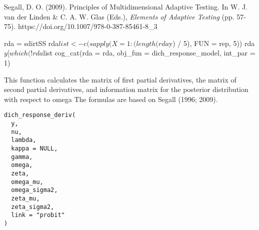 \documentclass[a4paper]{book}
\begin{document}
%
\begin{References}\relax
Segall, D. O. (2009). Principles of Multidimensional Adaptive Testing. In W.
J. van der Linden \& C. A. W. Glas (Eds.), \emph{Elements of Adaptive Testing}
(pp. 57-75). https://doi.org/10.1007/978-0-387-85461-8\_3
\end{References}
%
\begin{Examples}
\begin{ExampleCode}
rda = sdirtSS
rda$list <- c(sapply(X = 1:(length(rda$y) / 5), FUN = rep, 5))
rda$y[which(!rda$list %
cog_cat(rda = rda, obj_fun = dich_response_model, int_par = 1)

\end{ExampleCode}
\end{Examples}
%
\begin{Description}\relax
This function calculates the matrix of first partial derivatives, the matrix
of second partial derivatives, and information matrix for the posterior
distribution with respect to omega The formulas are based on Segall (1996;
2009).
\end{Description}
%
\begin{Usage}
\begin{verbatim}
dich_response_deriv(
  y,
  nu,
  lambda,
  kappa = NULL,
  gamma,
  omega,
  zeta,
  omega_mu,
  omega_sigma2,
  zeta_mu,
  zeta_sigma2,
  link = "probit"
)
\end{verbatim}
\end{Usage}
%
\end{document}
